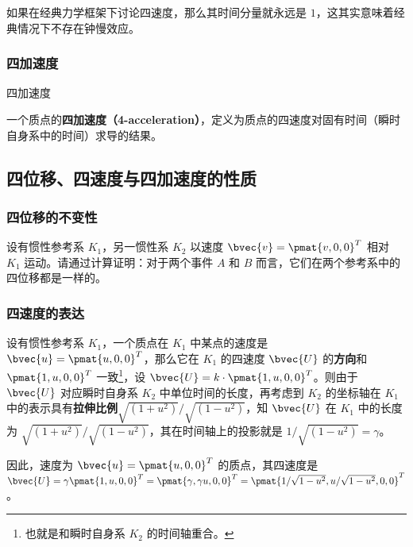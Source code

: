 如果在经典力学框架下讨论四速度，那么其时间分量就永远是 $1$，这其实意味着经典情况下不存在钟慢效应。

\subsubsection{四加速度}

\begin{definition}{四加速度}

一个质点的\textbf{四加速度（4-acceleration）}，定义为质点的四速度对固有时间（瞬时自身系中的时间）求导的结果。

\end{definition}

\subsection{四位移、四速度与四加速度的性质}\label{sub_SR4Rep_1}

\subsubsection{四位移的不变性}

\begin{exercise}{}

设有惯性参考系 $K_1$，另一惯性系 $K_2$ 以速度 $\bvec{v}=\pmat{v, 0, 0}^T$ 相对 $K_1$ 运动。请通过计算证明：对于两个事件 $A$ 和 $B$ 而言，它们在两个参考系中的四位移都是一样的。

\end{exercise}

\subsubsection{四速度的表达}

设有惯性参考系 $K_1$，一个质点在 $K_1$ 中某点的速度是 $\bvec{u}=\pmat{u, 0, 0}^T$，那么它在 $K_1$ 的四速度 $\bvec{U}$ 的\textbf{方向}和 $\pmat{1, u, 0, 0}^T$ 一致\footnote{也就是和瞬时自身系 $K_2$ 的时间轴重合。}，设 $\bvec{U}=k\cdot\pmat{1, u, 0, 0}^T$。则由于 $\bvec{U}$ 对应瞬时自身系 $K_2$ 中单位时间的长度，再考虑到 $K_2$ 的坐标轴在 $K_1$ 中的表示具有\textbf{拉伸比例}$\sqrt{(1+u^2)}/\sqrt{(1-u^2)}$，知 $\bvec{U}$ 在 $K_1$ 中的长度为 $\sqrt{(1+u^2)}/\sqrt{(1-u^2)}$，其在时间轴上的投影就是 $1/\sqrt{(1-u^2)}=\gamma$。

因此，速度为 $\bvec{u}=\pmat{u, 0, 0}^T$ 的质点，其四速度是 $\bvec{U}=\gamma\pmat{1, u, 0, 0}^T=\pmat{\gamma, \gamma u, 0, 0}^T=\pmat{1/\sqrt{1-u^2}, u/\sqrt{1-u^2}, 0, 0}^T$。

